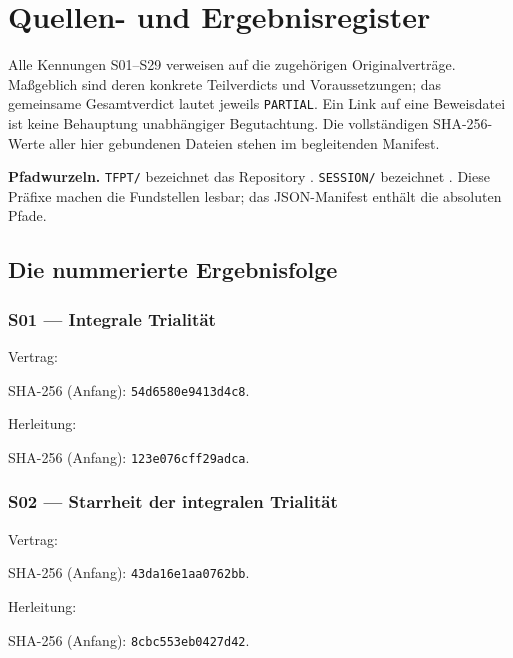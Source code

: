 \chapter{Quellen- und Ergebnisregister}
Alle Kennungen S01--S29 verweisen auf die zugehörigen Originalverträge. Maßgeblich sind deren konkrete Teilverdicts und Voraussetzungen; das gemeinsame Gesamtverdict lautet jeweils \texttt{PARTIAL}. Ein Link auf eine Beweisdatei ist keine Behauptung unabhängiger Begutachtung. Die vollständigen SHA-256-Werte aller hier gebundenen Dateien stehen im begleitenden Manifest.

\textbf{Pfadwurzeln.} \texttt{TFPT/} bezeichnet das Repository . \texttt{SESSION/} bezeichnet . Diese Präfixe machen die Fundstellen lesbar; das JSON-Manifest enthält die absoluten Pfade.

\section{Die nummerierte Ergebnisfolge}
\subsection*{S01 — Integrale Trialität}\label{s:01}
{\small{}\par}
Vertrag: \par{\footnotesize SHA-256 (Anfang): \texttt{54d6580e9413d4c8}.}\par
Herleitung: \par{\footnotesize SHA-256 (Anfang): \texttt{123e076cff29adca}.}\par
\subsection*{S02 — Starrheit der integralen Trialität}\label{s:02}
{\small{}\par}
Vertrag: \par{\footnotesize SHA-256 (Anfang): \texttt{43da16e1aa0762bb}.}\par
Herleitung: \par{\footnotesize SHA-256 (Anfang): \texttt{8cbc553eb0427d42}.}\par
